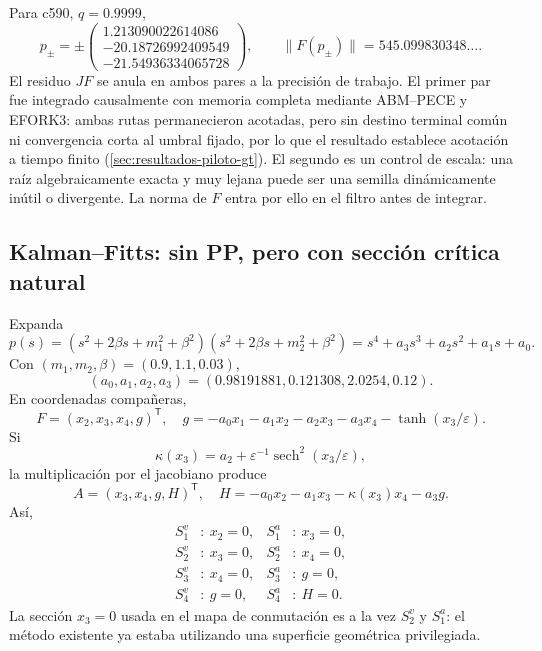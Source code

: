 Para c590, $q=0.9999$,
\begin{equation}
 p_\pm=\pm
 \begin{pmatrix}
 1.213090022614086\\
 -20.18726992409549\\
 -21.54936334065728
 \end{pmatrix},
 \qquad \lVert F(p_\pm)\rVert=545.099830348\ldots.
 \label{casegt:eq:c590-pp}
\end{equation}
El residuo $JF$ se anula en ambos pares a la precisión de trabajo. El primer par fue
integrado causalmente con memoria completa mediante ABM--PECE y EFORK3: ambas
rutas permanecieron acotadas, pero sin destino terminal común ni convergencia
corta al umbral fijado, por lo que el resultado establece acotación a tiempo finito
(\cref{sec:resultados-piloto-gt}). El segundo es un control
de escala: una raíz algebraicamente exacta y muy lejana puede ser una semilla
dinámicamente inútil o divergente. La norma de $F$ entra por ello en el filtro
antes de integrar.

\subsection{Kalman--Fitts: sin PP, pero con sección crítica natural}
\label{subsec:casegt-kalman}

Expanda
\begin{equation}
 p(s)=(s^2+2\beta s+m_1^2+\beta^2)
       (s^2+2\beta s+m_2^2+\beta^2)
 =s^4+a_3s^3+a_2s^2+a_1s+a_0.
 \label{casegt:eq:kalman-poly}
\end{equation}
Con $(m_1,m_2,\beta)=(0.9,1.1,0.03)$,
\begin{equation}
 (a_0,a_1,a_2,a_3)
 =(0.98191881,0.121308,2.0254,0.12).
 \label{casegt:eq:kalman-coefficients}
\end{equation}
En coordenadas compañeras,
\begin{equation}
 F=(x_2,x_3,x_4,g)^{\mathsf T},
 \quad
 g=-a_0x_1-a_1x_2-a_2x_3-a_3x_4
 -\tanh(x_3/\varepsilon).
 \label{casegt:eq:kalman-field}
\end{equation}
Si
\begin{equation}
 \kappa(x_3)=a_2+\varepsilon^{-1}
 \operatorname{sech}^2(x_3/\varepsilon),
 \label{casegt:eq:kalman-kappa}
\end{equation}
la multiplicación por el jacobiano produce
\begin{equation}
 A=(x_3,x_4,g,H)^{\mathsf T},
 \quad
 H=-a_0x_2-a_1x_3-\kappa(x_3)x_4-a_3g.
 \label{casegt:eq:kalman-A}
\end{equation}
Así,
\begin{align}
 S_1^v&:\ x_2=0,& S_1^a&:\ x_3=0,\nonumber\\
 S_2^v&:\ x_3=0,& S_2^a&:\ x_4=0,\nonumber\\
 S_3^v&:\ x_4=0,& S_3^a&:\ g=0,\\
 S_4^v&:\ g=0,& S_4^a&:\ H=0.
 \label{casegt:eq:kalman-surfaces}
\end{align}
La sección $x_3=0$ usada en el mapa de conmutación es a la vez
$S_2^v$ y $S_1^a$: el método existente ya estaba utilizando una superficie
geométrica privilegiada.

